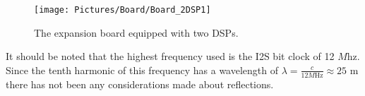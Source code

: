 \begin{figure}[H]
	\centering
	\texttt{[image: Pictures/Board/Board\_2DSP1]}	
	\caption{The expansion board equipped with two DSPs.}
	\label{fig:PCBboard}
\end{figure}

It should be noted that the highest frequency used is the I2S bit clock of 12 $M$hz. Since the tenth harmonic of this frequency has a wavelength of $\lambda=\frac{c}{12M \text{Hz}}\approx25\text{ m}$ there has not been any considerations made about reflections.